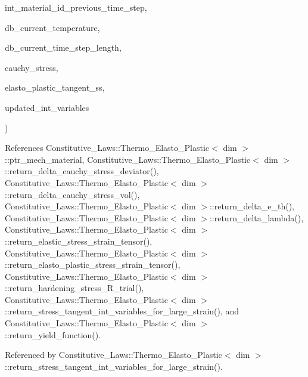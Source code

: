 {\begin{DoxyParamCaption}
\item[{unsigned int}]{int\+\_\+material\+\_\+id\+\_\+previous\+\_\+time\+\_\+step, }
\item[{double}]{db\+\_\+current\+\_\+temperature, }
\item[{double}]{db\+\_\+current\+\_\+time\+\_\+step\+\_\+length, }
\item[{Symmetric\+Tensor$<$ 2, dim $>$ \&}]{cauchy\+\_\+stress, }
\item[{Symmetric\+Tensor$<$ 4, dim $>$ \&}]{elasto\+\_\+plastic\+\_\+tangent\+\_\+ss, }
\item[{Q\+P\+H\+::internal\+\_\+variables\+\_\+incremental$<$ dim $>$ \&}]{updated\+\_\+int\+\_\+variables}
\end{DoxyParamCaption}
)\hspace{0.3cm}{\ttfamily [inline]}}\hypertarget{classConstitutive__Laws_1_1Thermo__Elasto__Plastic_a1d4b992d9e803ccfbd56d344f9ca7e41}{}\label{classConstitutive__Laws_1_1Thermo__Elasto__Plastic_a1d4b992d9e803ccfbd56d344f9ca7e41}


References Constitutive\+\_\+\+Laws\+::\+Thermo\+\_\+\+Elasto\+\_\+\+Plastic$<$ dim $>$\+::ptr\+\_\+mech\+\_\+material, Constitutive\+\_\+\+Laws\+::\+Thermo\+\_\+\+Elasto\+\_\+\+Plastic$<$ dim $>$\+::return\+\_\+delta\+\_\+cauchy\+\_\+stress\+\_\+deviator(), Constitutive\+\_\+\+Laws\+::\+Thermo\+\_\+\+Elasto\+\_\+\+Plastic$<$ dim $>$\+::return\+\_\+delta\+\_\+cauchy\+\_\+stress\+\_\+vol(), Constitutive\+\_\+\+Laws\+::\+Thermo\+\_\+\+Elasto\+\_\+\+Plastic$<$ dim $>$\+::return\+\_\+delta\+\_\+e\+\_\+th(), Constitutive\+\_\+\+Laws\+::\+Thermo\+\_\+\+Elasto\+\_\+\+Plastic$<$ dim $>$\+::return\+\_\+delta\+\_\+lambda(), Constitutive\+\_\+\+Laws\+::\+Thermo\+\_\+\+Elasto\+\_\+\+Plastic$<$ dim $>$\+::return\+\_\+elastic\+\_\+stress\+\_\+strain\+\_\+tensor(), Constitutive\+\_\+\+Laws\+::\+Thermo\+\_\+\+Elasto\+\_\+\+Plastic$<$ dim $>$\+::return\+\_\+elasto\+\_\+plastic\+\_\+stress\+\_\+strain\+\_\+tensor(), Constitutive\+\_\+\+Laws\+::\+Thermo\+\_\+\+Elasto\+\_\+\+Plastic$<$ dim $>$\+::return\+\_\+hardening\+\_\+stress\+\_\+\+R\+\_\+trial(), Constitutive\+\_\+\+Laws\+::\+Thermo\+\_\+\+Elasto\+\_\+\+Plastic$<$ dim $>$\+::return\+\_\+stress\+\_\+tangent\+\_\+int\+\_\+variables\+\_\+for\+\_\+large\+\_\+strain(), and Constitutive\+\_\+\+Laws\+::\+Thermo\+\_\+\+Elasto\+\_\+\+Plastic$<$ dim $>$\+::return\+\_\+yield\+\_\+function().



Referenced by Constitutive\+\_\+\+Laws\+::\+Thermo\+\_\+\+Elasto\+\_\+\+Plastic$<$ dim $>$\+::return\+\_\+stress\+\_\+tangent\+\_\+int\+\_\+variables\+\_\+for\+\_\+large\+\_\+strain().


